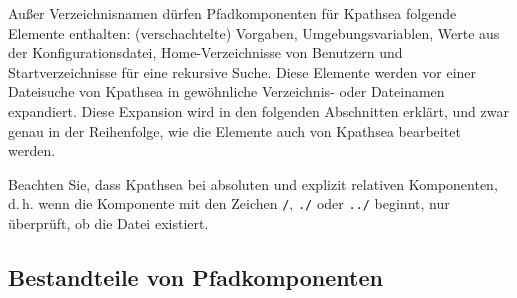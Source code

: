 \documentclass[12pt,ngerman,a4paper,fullparskip]{report}
\newcommand{\cmdname}[1]{\texttt{#1}}
\newcommand{\code}[1]{\texttt{#1}}
\newcommand{\file}[1]{\texttt{#1}}
\newcommand{\KPS}{Kpathsea\xspace}
\newcommand{\var}[1]{\texttt{#1}}
\newcommand{\samp}[1]{\texttt{#1}}
\begin{document}
%

Außer Verzeichnisnamen dürfen Pfadkomponenten für {\KPS} folgende
Elemente enthalten: (verschachtelte) Vorgaben, Umgebungsvariablen,
Werte aus der Konfigurationsdatei, Home-Verzeichnisse von
Benutzern und Startverzeichnisse für eine rekursive Suche. Diese
Elemente werden vor einer Dateisuche von {\KPS} in gewöhnliche
Verzeichnis- oder Dateinamen expandiert. Diese Expansion wird in
den folgenden Abschnitten erklärt, und zwar genau in der
Reihenfolge, wie die Elemente auch von {\KPS} bearbeitet werden.

Beachten Sie, dass {\KPS} bei absoluten und explizit relativen Komponenten,
d.\,h. wenn die Komponente mit den Zeichen \samp{/}, \samp{./} oder
\samp{../} beginnt, nur überprüft, ob die Datei existiert.

%

\subsection{Bestandteile von Pfadkomponenten}
\label{sec:path-expansion}
\end{document}
